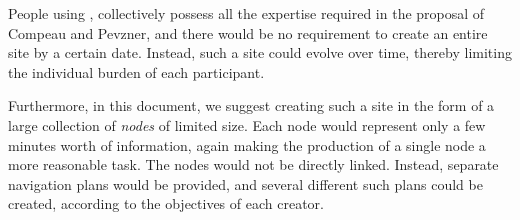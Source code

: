 People using \commonlisp{}, collectively possess all the expertise
required in the proposal of Compeau and Pevzner, and there would be no
requirement to create an entire site by a certain date.  Instead, such
a site could evolve over time, thereby limiting the individual burden
of each participant.

Furthermore, in this document, we suggest creating such a site in the
form of a large collection of \emph{nodes} of limited size.  Each node
would represent only a few minutes worth of information, again making
the production of a single node a more reasonable task.  The nodes
would not be directly linked.  Instead, separate navigation plans
would be provided, and several different such plans could be created,
according to the objectives of each creator.
